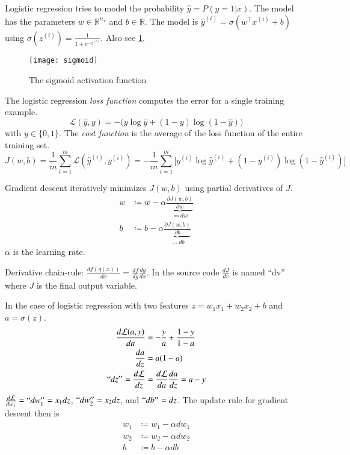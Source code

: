 \documentclass{article}
\begin{document}
Logistic regression tries to model the probability $\widehat{y}=P(y=1|x)$.
The model has the parameters $w\in\mathbb{R}^{n_x}$ and $b\in\mathbb{R}$.
The model is $\widehat{y}^{(i)}=\sigma(w^\top x^{(i)}+b)$ using $\sigma(z^{(i)})=\frac{1}{1+e^{-z^{(i)}}}$.
Also see \cref{fig:sigmoid}.
\begin{figure}[htbp]
  \begin{center}
    \texttt{[image: sigmoid]}
    \caption{The sigmoid activation function}
    \label{fig:sigmoid}
  \end{center}
\end{figure}

The logistic regression \emph{loss function} computes the error for a single training example.
\begin{equation}
  \mathcal{L}(\widehat{y},y)=-\big(y\log\widehat{y}+(1-y)\log(1-\widehat{y})\big)
\end{equation}
with $y\in\{0,1\}$.
The \emph{cost function} is the average of the loss function of the entire training set.
\begin{equation}
  J(w,b)=\frac{1}{m}\sum_{i=1}^m\mathcal{L}(\widehat{y}^{(i)},y^{(i)})=
  -\frac{1}{m}\sum_{i=1}^m\big[y^{(i)}\log\widehat{y}^{(i)}+(1-y^{(i)})\log(1-\widehat{y}^{(i)})\big]
\end{equation}

Gradient descent iteratively minimizes $J(w,b)$ using partial derivatives of $J$.
\begin{equation}
  \begin{split}
    w&\coloneqq w-\alpha\underbrace{\frac{\partial J(w,b)}{\partial w}}_{\eqqcolon dw}\\
    b&\coloneqq b-\alpha\underbrace{\frac{\partial J(w,b)}{\partial b}}_{\eqqcolon db}
  \end{split}
\end{equation}
$\alpha$ is the learning rate.

Derivative chain-rule: $\frac{df(g(x))}{dx}=\frac{df}{dg}\frac{dg}{dx}$.
In the source code $\frac{dJ}{dv}$ is named ``dv'' where $J$ is the final output variable.

In the case of logistic regression with two features $z=w_1x_1+w_2x_2+b$ and $a=\sigma(z)$.
\begin{equation}
  \begin{split}
    \frac{d\mathcal{L}(a,y)}{da}&=-\frac{y}{a}+\frac{1-y}{1-a}\\
    \frac{da}{dz}&=a(1-a)\\
    ``dz''=\frac{d\mathcal{L}}{dz}&=\frac{d\mathcal{L}}{da}\frac{da}{dz}=a-y
  \end{split}
\end{equation}
$\frac{d\mathcal{L}}{dw_1}=``dw_1''=x_1 dz$, $``dw_2''=x_2dz$, and $``db''=dz$.
The update rule for gradient descent then is
\begin{equation}
  \begin{split}
    w_1&\coloneqq w_1-\alpha dw_1\\
    w_2&\coloneqq w_2-\alpha dw_2\\
    b&\coloneqq b-\alpha db\\
  \end{split}
\end{equation}
\end{document}
